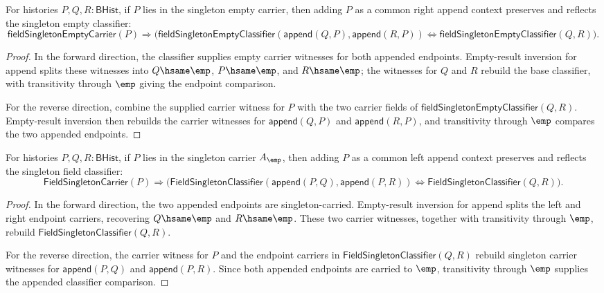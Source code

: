 \begin{theorem}
\label{thm:field-singleton-empty-classifier-append-right-cancel}
For histories $P,Q,R:\mathsf{BHist}$, if $P$ lies in the singleton empty
carrier, then adding $P$ as a common right append context preserves and
reflects the singleton empty classifier:
$$
\mathsf{fieldSingletonEmptyCarrier}(P)\Rightarrow
\bigl(
\mathsf{fieldSingletonEmptyClassifier}(\mathsf{append}(Q,P),\mathsf{append}(R,P))
\Longleftrightarrow
\mathsf{fieldSingletonEmptyClassifier}(Q,R)
\bigr).
$$
\end{theorem}
\begin{proof}
In the forward direction, the classifier supplies empty carrier witnesses for
both appended endpoints. Empty-result inversion for append splits these
witnesses into $Q\hsame\emp$, $P\hsame\emp$, and $R\hsame\emp$; the
witnesses for $Q$ and $R$ rebuild the base classifier, with transitivity
through $\emp$ giving the endpoint comparison.

For the reverse direction, combine the supplied carrier witness for $P$ with
the two carrier fields of $\mathsf{fieldSingletonEmptyClassifier}(Q,R)$.
Empty-result inversion then rebuilds the carrier witnesses for
$\mathsf{append}(Q,P)$ and $\mathsf{append}(R,P)$, and transitivity through
$\emp$ compares the two appended endpoints.
\end{proof}

\begin{theorem}
\label{thm:field-singleton-classifier-append-left-cancel}
For histories $P,Q,R:\mathsf{BHist}$, if $P$ lies in the singleton carrier
$A_{\emp}$, then adding $P$ as a common left append context preserves and
reflects the singleton field classifier:
$$
\mathsf{FieldSingletonCarrier}(P)\Rightarrow
\bigl(
\mathsf{FieldSingletonClassifier}(\mathsf{append}(P,Q),\mathsf{append}(P,R))
\Longleftrightarrow
\mathsf{FieldSingletonClassifier}(Q,R)
\bigr).
$$
\end{theorem}
\begin{proof}
In the forward direction, the two appended endpoints are singleton-carried.
Empty-result inversion for append splits the left and right endpoint carriers,
recovering $Q\hsame\emp$ and $R\hsame\emp$. These two carrier witnesses,
together with transitivity through $\emp$, rebuild
$\mathsf{FieldSingletonClassifier}(Q,R)$.

For the reverse direction, the carrier witness for $P$ and the endpoint
carriers in $\mathsf{FieldSingletonClassifier}(Q,R)$ rebuild singleton carrier
witnesses for $\mathsf{append}(P,Q)$ and $\mathsf{append}(P,R)$. Since both
appended endpoints are carried to $\emp$, transitivity through $\emp$ supplies
the appended classifier comparison.
\end{proof}

